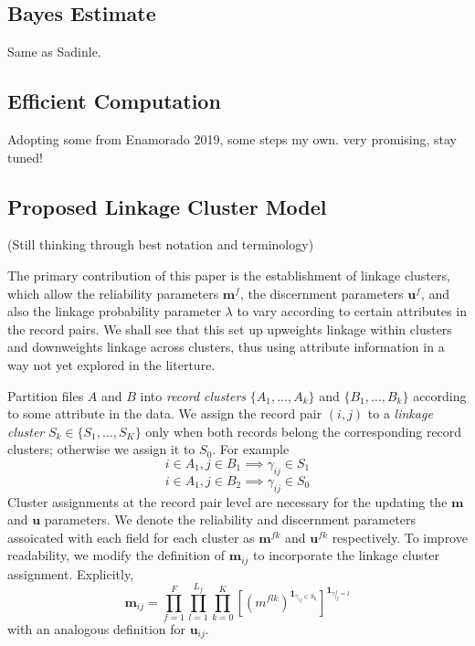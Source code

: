 \documentclass[
  12pt,
]{article}
\begin{document}
\hypertarget{bayes-estimate}{%
\subsection{Bayes Estimate}\label{bayes-estimate}}

Same as Sadinle.

\hypertarget{efficient-computation}{%
\subsection{Efficient Computation}\label{efficient-computation}}

Adopting some from Enamorado 2019, some steps my own. very promising,
stay tuned!

\newpage

\hypertarget{proposed-linkage-cluster-model}{%
\subsection{Proposed Linkage Cluster
Model}\label{proposed-linkage-cluster-model}}

(Still thinking through best notation and terminology)

The primary contribution of this paper is the establishment of linkage
clusters, which allow the reliability parameters \(\mathbf{m}^f\), the
discernment parameters \(\mathbf{u}^f\), and also the linkage
probability parameter \(\lambda\) to vary according to certain
attributes in the record pairs. We shall see that this set up upweights
linkage within clusters and downweights linkage across clusters, thus
using attribute information in a way not yet explored in the literture.

Partition files \(A\) and \(B\) into \emph{record clusters}
\(\{A_1, \ldots, A_k\}\) and \(\{B_1, \ldots, B_k\}\) according to some
attribute in the data. We assign the record pair \((i,j)\) to a
\emph{linkage cluster} \(S_k \in \{S_1, \ldots, S_K\}\) only when both
records belong the corresponding record clusters; otherwise we assign it
to \(S_0\). For example
\[i \in A_1, j \in B_1 \implies \gamma_{ij} \in S_1\]
\[i \in A_1, j \in B_2 \implies \gamma_{ij} \in S_0\] Cluster
assignments at the record pair level are necessary for the updating the
\(\mathbf{m}\) and \(\mathbf{u}\) parameters. We denote the reliability
and discernment parameters assoicated with each field for each cluster
as \(\mathbf{m}^{fk}\) and \(\mathbf{u}^{fk}\) respectively. To improve
readability, we modify the definition of \(\mathbf{m}_{ij}\) to
incorporate the linkage cluster assignment. Explicitly,
\[\mathbf{m}_{ij} = \prod_{f=1}^{F}\prod_{l=1}^{L_f}\prod_{k=0}^{K}\left[ \left(m^{flk}\right)^{\mathbf{1}_{\gamma_{ij} \in S_k}}\right]^{\mathbf{1}_{\gamma_{ij}^f = l}}\]
with an analogous definition for \(\mathbf{u}_{ij}\).
\end{document}
